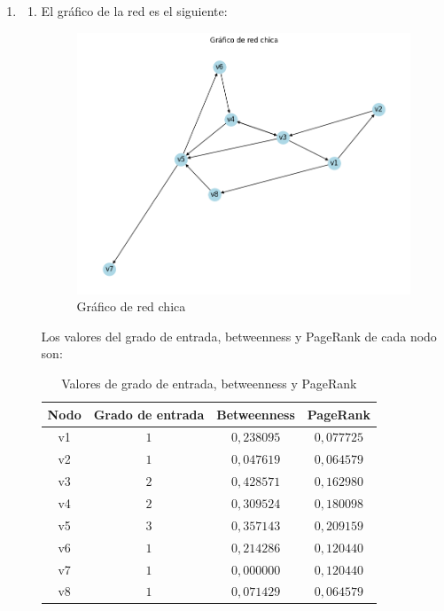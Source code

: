 \documentclass[12pt]{article}
\begin{document}
\begin{enumerate}
    \item
    \begin{enumerate}
        \item El gráfico de la red es el siguiente:
        \begin{figure}[H]
            \centering
            \includegraphics[scale=0.5]{images/grafico_red_chica.png}
            \caption{Gráfico de red chica}
            \label{fig:graph_red_chica}
        \end{figure}

        Los valores del grado de entrada, betweenness y PageRank de cada nodo son:
        
        \begin{table}[H]
            \centering
            \begin{tabular}{|c|c|c|c|}
            \hline
            Nodo & Grado de entrada & Betweenness & PageRank \\ \hline
            v1 & $1$ & $0,238095$ & $0,077725$ \\ \hline
            v2 & $1$ & $0,047619$ & $0,064579$ \\ \hline
            v3 & $2$ & $0,428571$ & $0,162980$ \\ \hline
            v4 & $2$ & $0,309524$ & $0,180098$ \\ \hline
            v5 & $3$ & $0,357143$ & $0,209159$ \\ \hline
            v6 & $1$ & $0,214286$ & $0,120440$ \\ \hline
            v7 & $1$ & $0,000000$ & $0,120440$ \\ \hline
            v8 & $1$ & $0,071429$ & $0,064579$ \\ \hline
            \end{tabular}
            \caption{Valores de grado de entrada, betweenness y PageRank}
            \label{tab:values_red_chica}
        \end{table}


\end{enumerate}
\end{enumerate}
\end{document}
